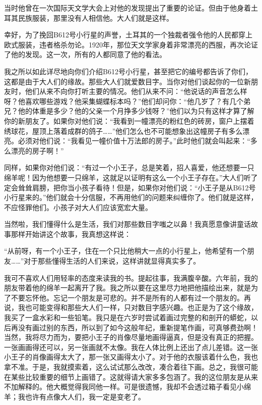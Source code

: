 {\startalignment[center]
 \stopalignment}

当时他曾在一次国际天文学大会上对他的发现提出了重要的论证。但由于他身着土耳其民族服装，那里没有人相信他。大人们就是这样。

{\startalignment[center]
 \stopalignment}

幸好，为了挽回B612号小行星的声誉，土耳其的一个独裁者强令他的人民都穿上欧式服装，违者格杀勿论。1920年，那位天文学家身着非常漂亮的西服，再次论证了他的发现。这一次，所有的人都同意了他的看法。

我之所以如此详尽地向你们介绍B612号小行星，甚至把它的编号都告诉了你们，这都是由于大人们的缘故。那些大人们就爱数目字。当你对他们谈起你的一位新朋友时，他们从来不向你打听主要的情况。他们从来不问：“他说话的声音怎么样呀？他喜欢哪些游戏？他采集蝴蝶标本吗？”他们却问你：“他几岁了？有几个弟兄？他的体重是多少？他的父亲一个月挣多少钱呀？”他们以为只有这样才算了解你的新朋友了。如果你对他们说：“我看到一幢漂亮的粉红色的砖房，窗户上摆着绣球花，屋顶上落着成群的鸽子\ldots{}\ldots{}”他们怎么也不可能想象出这幢房子有多么漂亮。必须对他们说：“我看见一幢价值十万法郎的房子。”此时他们就会叫起来：“多么漂亮的房子啊！”

同样，如果你对他们说：“有过一个小王子，总是笑着，招人喜爱，他还想要一只绵羊呢！因为他想要一只绵羊，这就足以证明有这么一个小王子存在。”大人们听了定会耸耸肩膀，把你当小孩子看待！但是，如果你对他们说：“小王子是从B612号小行星来的。”他们就会十分信服，不再用他们的问题来纠缠你了。他们就是这样，不应怪罪他们。小孩子对大人们应该宽宏大量。

当然啦，我们懂得什么是生活，我们对那些数目字嗤之以鼻！我真愿意像讲童话故事那样开始讲这个故事，我真想这样说：

“从前呀，有一个小王子，住在一个只比他稍大一点的小行星上，他希望有一个朋友\ldots{}\ldots{}”对于那些懂得生活的人们来说，这样讲就显得真实多了。

我可不喜欢人们用轻率的态度来读我的书。提起往事，我满腹辛酸。六年前，我的朋友带着他的绵羊一起离开了我。我之所以要在这里尽力地把他描绘出来，就是为了不要忘怀他。忘记一个朋友是可悲的。并不是所有的人都有过一个朋友的。再说，我也可能变得和那些大人们一样，只对数目字感兴趣。也正是为了这个缘故，我买了一盒水彩和一些铅笔。我只是在六岁时尝试着画过完整的和剖开的蟒蛇，以后再没有画过别的东西，所以到了如今这般年纪，重新提笔作画，可真够费劲啊！当然，我将尽力而为，要把小王子的肖像尽量地画得逼真，但是没有真正的把握。一张画画得还可以，另一张画就不太像。我在人体比例上还出了点儿差错。这一张小王子的肖像画得太大了，那一张又画得太小了。对于他的衣服该着什么色，我也拿不准。于是，我就摸索着，这么试试那么改改，凑合着往下画。总之，我很可能在某些比较重要的细节上画错了。这就得请大家多多包涵了。我的这位朋友是从来不加解释的。他大概觉得我同他一样。可是很遗憾，我却不会透过箱子看见小绵羊；我也许有点像大人们，我一定是变老了。

